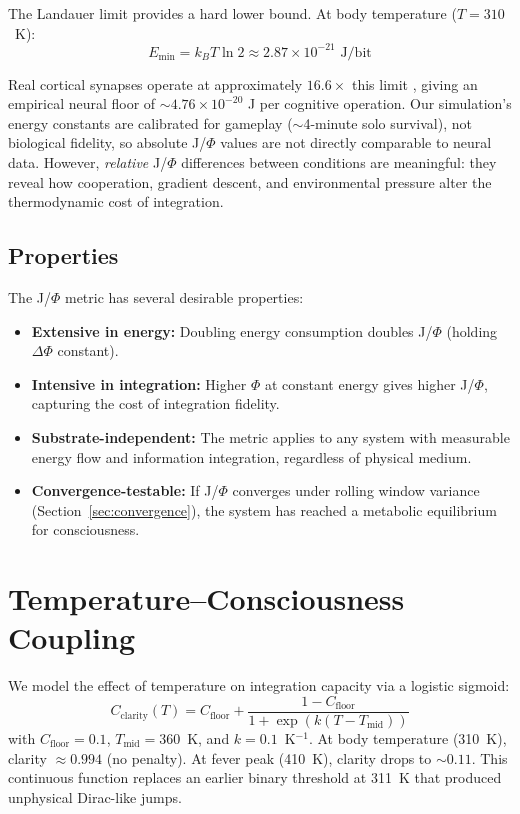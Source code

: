 \documentclass[entropy,article]{Definitions/mdpi}
\begin{document}
The Landauer limit provides a hard lower bound. At body temperature ($T = 310$~K):
\begin{equation}
E_{\min} = k_BT\ln 2 \approx 2.87 \times 10^{-21} \text{ J/bit}
\end{equation}

Real cortical synapses operate at approximately $16.6\times$ this limit \citep{laughlin2003}, giving an empirical neural floor of $\sim 4.76 \times 10^{-20}$ J per cognitive operation. Our simulation's energy constants are calibrated for gameplay ($\sim$4-minute solo survival), not biological fidelity, so absolute J/$\Phi$ values are not directly comparable to neural data. However, \emph{relative} J/$\Phi$ differences between conditions are meaningful: they reveal how cooperation, gradient descent, and environmental pressure alter the thermodynamic cost of integration.

\subsection{Properties}

The J/$\Phi$ metric has several desirable properties:
\begin{itemize}
\item \textbf{Extensive in energy:} Doubling energy consumption doubles J/$\Phi$ (holding $\Delta\Phi$ constant).
\item \textbf{Intensive in integration:} Higher $\Phi$ at constant energy gives higher J/$\Phi$, capturing the cost of integration fidelity.
\item \textbf{Substrate-independent:} The metric applies to any system with measurable energy flow and information integration, regardless of physical medium.
\item \textbf{Convergence-testable:} If J/$\Phi$ converges under rolling window variance (Section~\ref{sec:convergence}), the system has reached a metabolic equilibrium for consciousness.
\end{itemize}

\section{Temperature--Consciousness Coupling}
\label{sec:temperature}

We model the effect of temperature on integration capacity via a logistic sigmoid:
\begin{equation}
C_{\text{clarity}}(T) = C_{\text{floor}} + \frac{1 - C_{\text{floor}}}{1 + \exp\left(k(T - T_{\text{mid}})\right)}
\label{eq:temperature}
\end{equation}
with $C_{\text{floor}} = 0.1$, $T_{\text{mid}} = 360$~K, and $k = 0.1$~K$^{-1}$. At body temperature (310~K), clarity $\approx 0.994$ (no penalty). At fever peak (410~K), clarity drops to $\sim 0.11$. This continuous function replaces an earlier binary threshold at 311~K that produced unphysical Dirac-like jumps.
\end{document}
